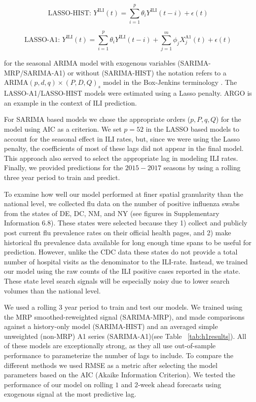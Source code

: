 \documentclass[fleqn,10pt]{wlscirep}
\begin{document}
\begin{equation}
\text{LASSO-HIST: } Y^{\text{ILI}}(t) = \sum_{i=1}^p \theta_i Y^{\text{ILI}}(t-i)+\epsilon(t)
\end{equation}

\begin{equation}
\text{LASSO-A1: } Y^{\text{ILI}}(t) = \sum_{i=1}^p \theta_i Y^{\text{ILI}}(t-i) +  \sum_{j=1}^m \phi_j X_j^{\text{A1}}(t) + \epsilon(t)
\end{equation}

for the seasonal ARIMA model with exogenous variables (SARIMA-MRP/SARIMA-A1) or without (SARIMA-HIST) the notation refers to a ARIMA$(p,d,q)\times(P,D,Q)_s$ model in the Box-Jenkins terminology \cite{box_etal_2015}. The LASSO-A1/LASSO-HIST models were estimated using a Lasso penalty. ARGO \cite{yang_etal_2015inference, yang_etal_2015} is an example in the context of ILI prediction.  

For SARIMA based models we chose the appropriate orders ($p,P,q,Q$) for the model using AIC as a criterion. We set $p=52$ in the LASSO based models to account for the seasonal effect in ILI rates, but, since we were using the Lasso penalty, the coefficients of most of these lags did not appear in the final model. This approach also served to select the appropriate lag in modeling ILI rates. Finally, we provided predictions for the $2015-2017$ seasons by using a rolling three year period to train and predict.

To examine how well our model performed at finer spatial granularity than the national level, we collected flu data on the number of positive influenza swabs from the states of DE, DC, NM, and NY (see figures in Supplementary Information 6.8). These states were selected because they 1) collect and publicly post current flu prevalence rates on their official health pages, and 2) make historical flu prevalence data available for long enough time spans to be useful for prediction. However, unlike the CDC data these states do not provide a total number of hospital visits as the denominator to the ILI-rate. Instead, we trained our model using the raw counts of the ILI positive cases reported in the state. These state level search signals will be especially noisy due to lower search volumes than the national level. 

We used a rolling $3$ year period to train and test our models. We trained using the MRP smoothed-reweighted signal (SARIMA-MRP), and made comparisons against a history-only model (SARIMA-HIST) and an averaged simple unweighted (non-MRP) A1 series (SARIMA-A1)(see Table ~\ref{tab:h1results}). All of these models are exceptionally strong, as they all use out-of-sample performance to parameterize the number of lags to include. To compare the different methods we used RMSE as a metric after selecting the model parameters based on the AIC (Akaike Information Criterion). We tested the performance of our model on rolling $1$ and $2$-week ahead forecasts using exogenous signal at the most predictive lag.
\end{document}

